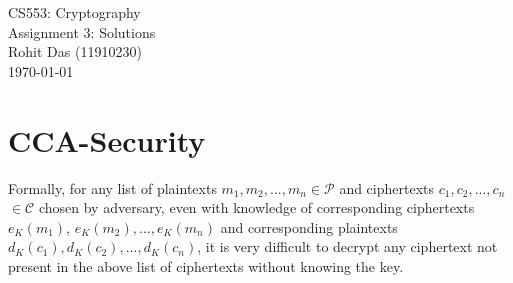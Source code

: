 \documentclass[12pt]{article}
\begin{document}
\begin{titlepage}
\centering
\vspace*{\fill}
\huge CS553: Cryptography\\
\LARGE Assignment 3: Solutions\\
\Large Rohit Das (11910230)\\\vspace{0.8cm}
\today
\vspace*{\fill}
\end{titlepage}

\section{CCA-Security}
\begin{large}

Formally, for any list of plaintexts $m_1,m_2,...,m_n \in \mathcal{P}$ and ciphertexts $c_1,c_2,...,c_n$ $\in \mathcal{C}$ chosen by adversary, even with knowledge of corresponding ciphertexts $e_K(m_1)$, $e_K(m_2),...,e_K(m_n)$ and corresponding plaintexts $d_K(c_1),d_K(c_2),...,d_K(c_n)$, it is very difficult to decrypt any ciphertext not present in the above list of ciphertexts without knowing the key.
\end{large}
\end{document}
